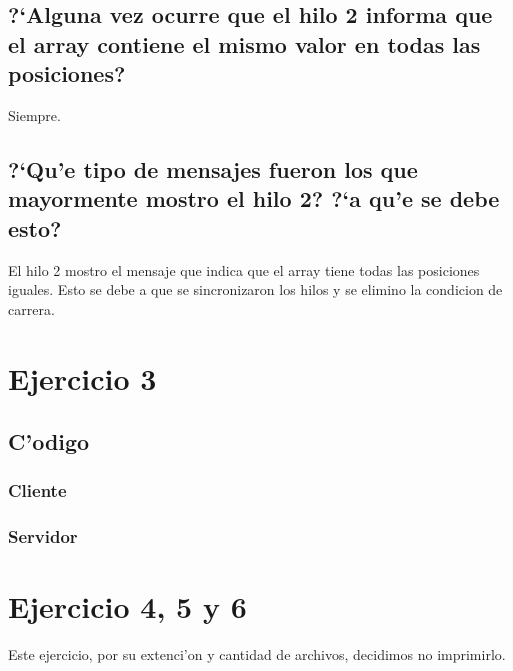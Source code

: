 \documentclass[a4paper,11pt]{article}
\newcommand{\?}{?`}
\begin{document}
\subsection[Punto A]{\?Alguna vez ocurre que el hilo 2 informa que el array contiene el mismo valor en todas las posiciones?}
Siempre.

\subsection[Punto B]{\?Qu'e tipo de mensajes fueron los que mayormente mostro el hilo 2? \?a qu'e se debe esto?}
El hilo 2 mostro el mensaje que indica que el array tiene todas las posiciones iguales. Esto se debe a que se sincronizaron los hilos y se elimino la condicion de carrera.

\section{Ejercicio 3}
\subsection{C'odigo}
\subsubsection{Cliente}


\subsubsection{Servidor}


\section{Ejercicio 4, 5 y 6}
Este ejercicio, por su extenci'on y cantidad de archivos, decidimos no imprimirlo.
\end{document}
